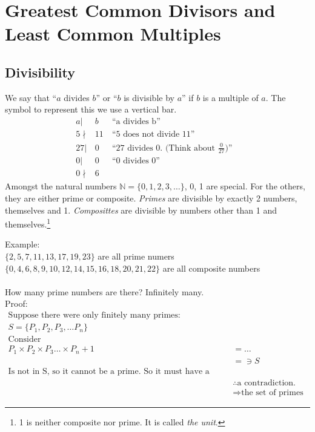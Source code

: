 \chapter{Greatest Common Divisors and Least Common Multiples}
\label{chap:GreatestcommonDivisorAndLeastCommoonMultiples}

\section{Divisibility}
\label{sec:Divisibility}
We say that ``$a$ divides $b$'' or ``$b$ is divisible by $a$'' if $b$ is a
multiple of $a$. The symbol to represent this we use a vertical bar.
\begin{align}
   a|&b  &~ \text{``a divides b''} & \\
   5∤&11 &~ \text{``5 does not divide 11''} & \\
  27|&0  &~ \text{``27 divides 0. (Think about $\frac{0}{27}$)''} & \\
   0|&0  &~ \text{``0 divides 0''} & \\
   0∤&6
\end{align}
Amongst the natural numbers $\mathbb{N} = \{0, 1, 2, 3, \ldots\}$, 0, 1 are
special. For the others, they are either prime or composite. \emph{Primes} are
divisible by exactly 2 numbers, themselves and 1. \emph{Composittes} are
divisible by numbers other than 1 and themselves.\footnote{1 is neither
composite nor prime. It is called \emph{the unit}.}

Example:\\
$\{2, 5, 7, 11, 13, 17, 19, 23 \}$ are all prime numers
$\{0,4,6,8,9,10,12,14,15,16,18,20,21,22\}$ are all composite numbers\\
\\
How many prime numbers are there? Infinitely many.\\
Proof:
\begin{align}
  \text{Suppose there were only finitely many primes:} \\
  S = \{P_1, P_2, P_3, \ldots P_n \} \\
  \text{Consider} \\
  P_1 \times P_2 \times P_3 \ldots \times P_n + 1 & = \ldots \\
   & = \ni S \\
  \text{Is not in S, so it cannot be a prime. So it must have a prime factor.
  But, none of the primes divide it, because they all leave a remainder of 1.
  So it cannot be composite either.} \\
  & \therefore \text{a contradiction.} \\
  & \Rightarrow \text{the set of primes must be infinite.}
\end{align}

